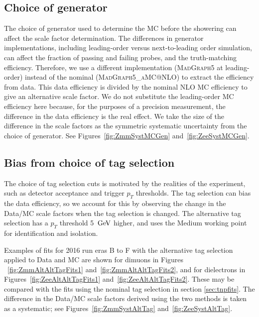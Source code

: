 {\clearpage
\subsection{Choice of generator}
The choice of generator used to determine the MC before the showering can affect the scale factor determination.
The differences in generator implementations, including leading-order versus next-to-leading order simulation,
can affect the fraction of passing and failing probes, and the truth-matching efficiency.
Therefore, we use a different implementation (\textsc{MadGraph5} at leading-order)
instead of the nominal (\textsc{MadGraph5\_aMC@NLO}) to extract the efficiency from data.
This data efficiency is divided by the nominal NLO MC efficiency to give an alternative scale factor. 
We do not substitute the leading-order MC efficiency here because, 
for the purposes of a precision measurement, the difference in the data efficiency is the real effect.
We take the size of the difference in the scale factors as the symmetric systematic uncertainty from the choice of generator.
See Figures~\ref{fig:ZmmSystMCGen} and~\ref{fig:ZeeSystMCGen}.


\clearpage
\subsection{Bias from choice of tag selection}
The choice of tag selection cuts is motivated by the realities of the experiment, such as
detector acceptance and trigger $p_{T}$ thresholds. The tag selection can bias the data efficiency,
so we account for this by observing the change in the Data/MC scale factors when the 
tag selection is changed. The alternative tag selection has a $p_{T}$ threshold 5 $\,\text{Ge\hspace{-.08em}V}$ higher, and 
uses the Medium working point for identification and isolation.

Examples of fits for 2016 run eras B to F with the alternative tag selection applied to Data and MC are shown for dimuons in
Figures ~\ref{fig:ZmmAltAltTagFits1} and~\ref{fig:ZmmAltAltTagFits2}, 
and for dielectrons in Figures~\ref{fig:ZeeAltAltTagFits1} and~\ref{fig:ZeeAltAltTagFits2}.
These may be compared with the fits using the nominal tag selection in section \ref{sec:tnpfits}.
The difference in the Data/MC scale factors derived using the two methods is taken as a systematic; 
see Figures~\ref{fig:ZmmSystAltTag} and~\ref{fig:ZeeSystAltTag}.

}
